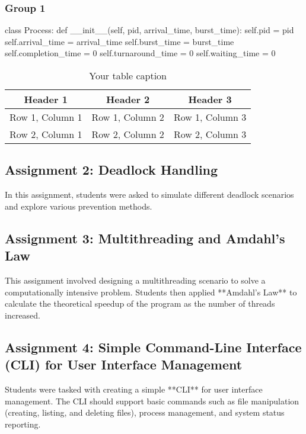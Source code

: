 \documentclass[12pt]{article}
\begin{document}
\subsubsection{Group 1}
\begin{python}
    class Process:
    def __init__(self, pid, arrival_time, burst_time):
        self.pid = pid
        self.arrival_time = arrival_time
        self.burst_time = burst_time
        self.completion_time = 0
        self.turnaround_time = 0
        self.waiting_time = 0
\end{python}

\begin{table}[htbp] %
    \centering
    \begin{tabular}{|c|c|c|} %
    \hline
    Header 1 & Header 2 & Header 3 \\ %
    \hline
    Row 1, Column 1 & Row 1, Column 2 & Row 1, Column 3 \\ %
    \hline
    Row 2, Column 1 & Row 2, Column 2 & Row 2, Column 3 \\ %
    \hline
    \end{tabular}
    \caption{Your table caption} %
    \label{tab:your_label} %
\end{table}
\subsection{Assignment 2: Deadlock Handling}
In this assignment, students were asked to simulate different deadlock scenarios and explore various prevention methods.

\subsection{Assignment 3: Multithreading and Amdahl's Law}
This assignment involved designing a multithreading scenario to solve a computationally intensive problem. Students then applied **Amdahl's Law** to calculate the theoretical speedup of the program as the number of threads increased.

\subsection{Assignment 4: Simple Command-Line Interface (CLI) for User Interface Management}
Students were tasked with creating a simple **CLI** for user interface management. The CLI should support basic commands such as file manipulation (creating, listing, and deleting files), process management, and system status reporting.
\end{document}
